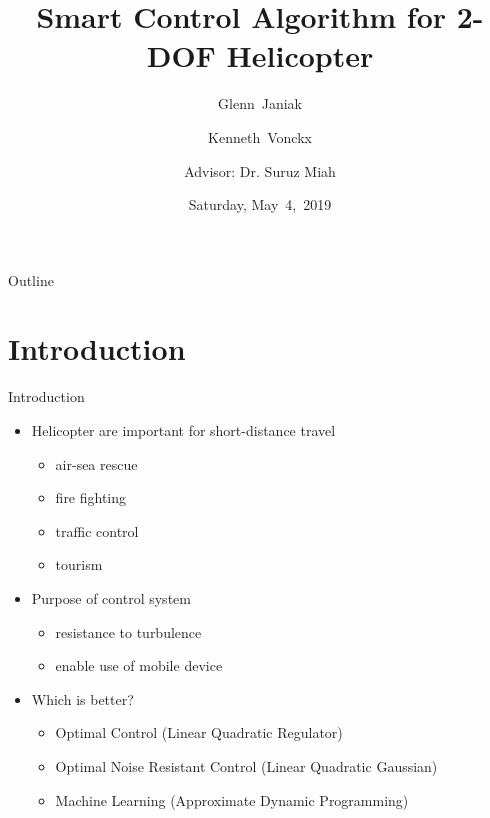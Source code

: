 \documentclass{beamer}
\title[2-DOF Helicopter]{Smart Control Algorithm for 2-DOF Helicopter}
\author[G.~Janiak, K.~Vonckx]{Glenn~Janiak \and Kenneth~Vonckx \and
Advisor: Dr. Suruz Miah}
\institute[Bradley University] %
{
  Department of Electrical and Computer Engineering\\
  Bradley University\\
  1501 W. Bradley Avenue\\
  Peoria, IL, 61625, USA
}
\date[May~4,~2019]{Saturday, May~4,~2019}
\begin{document}
\begin{frame}
  \titlepage
\end{frame}

\begin{frame}{Outline} 
  \tableofcontents%
\end{frame}

\section{Introduction}

\begin{frame}{Introduction}{}
    \begin{itemize}
        \item Helicopter are important for short-distance travel
            \begin{itemize}
                \item air-sea rescue
                \item fire fighting
                \item traffic control
                \item tourism
            \end{itemize}
        \item Purpose of control system
            \begin{itemize}
                \item resistance to turbulence
                \item enable use of mobile device
            \end{itemize}
        \item Which is better?
            \begin{itemize}
                \item Optimal Control (Linear Quadratic Regulator)
                \item Optimal Noise Resistant Control (Linear Quadratic Gaussian) 
                \item Machine Learning (Approximate Dynamic Programming)
            \end{itemize}
    \end{itemize}
\end{frame}

\end{document}
